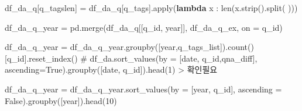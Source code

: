 \documentclass[
  letterpaper,
  DIV=11,
  numbers=noendperiod]{scrartcl}
\newenvironment{Shaded}{\begin{snugshade}}{\end{snugshade}}
\newcommand{\BuiltInTok}[1]{\textcolor[rgb]{0.00,0.23,0.31}{#1}}
\newcommand{\CommentTok}[1]{\textcolor[rgb]{0.37,0.37,0.37}{#1}}
\newcommand{\DecValTok}[1]{\textcolor[rgb]{0.68,0.00,0.00}{#1}}
\newcommand{\KeywordTok}[1]{\textcolor[rgb]{0.00,0.23,0.31}{\textbf{#1}}}
\newcommand{\NormalTok}[1]{\textcolor[rgb]{0.00,0.23,0.31}{#1}}
\newcommand{\OperatorTok}[1]{\textcolor[rgb]{0.37,0.37,0.37}{#1}}
\newcommand{\StringTok}[1]{\textcolor[rgb]{0.13,0.47,0.30}{#1}}
\newcommand{\VariableTok}[1]{\textcolor[rgb]{0.07,0.07,0.07}{#1}}
\begin{document}
\begin{Shaded}
\begin{Highlighting}[]
\NormalTok{df\_da\_q[}\StringTok{\textquotesingle{}q\_tagslen\textquotesingle{}}\NormalTok{] }\OperatorTok{=}\NormalTok{ df\_da\_q[}\StringTok{\textquotesingle{}q\_tags\textquotesingle{}}\NormalTok{].}\BuiltInTok{apply}\NormalTok{(}\KeywordTok{lambda}\NormalTok{ x : }\BuiltInTok{len}\NormalTok{(x.strip().split(}\StringTok{\textquotesingle{} \textquotesingle{}}\NormalTok{)))}
\end{Highlighting}
\end{Shaded}

\begin{Shaded}
\begin{Highlighting}[]
\NormalTok{df\_da\_q\_year }\OperatorTok{=}\NormalTok{ pd.merge(df\_da\_q[[}\StringTok{\textquotesingle{}q\_id\textquotesingle{}}\NormalTok{, }\StringTok{\textquotesingle{}year\textquotesingle{}}\NormalTok{]], df\_da\_q\_ex, on }\OperatorTok{=} \StringTok{\textquotesingle{}q\_id\textquotesingle{}}\NormalTok{)}
\end{Highlighting}
\end{Shaded}

\begin{Shaded}
\begin{Highlighting}[]
\NormalTok{df\_da\_q\_year }\OperatorTok{=}\NormalTok{ df\_da\_q\_year.groupby([}\StringTok{\textquotesingle{}year\textquotesingle{}}\NormalTok{,}\StringTok{\textquotesingle{}q\_tags\_list\textquotesingle{}}\NormalTok{]).count()[}\StringTok{\textquotesingle{}q\_id\textquotesingle{}}\NormalTok{].reset\_index()}
\CommentTok{\#  df\_da.sort\_values(by = [\textquotesingle{}date\textquotesingle{}, \textquotesingle{}q\_id\textquotesingle{},\textquotesingle{}qna\_diff\textquotesingle{}], ascending=True).groupby([\textquotesingle{}date\textquotesingle{}, \textquotesingle{}q\_id\textquotesingle{}]).head(1) \textgreater{} 확인필요 }
\end{Highlighting}
\end{Shaded}

\begin{Shaded}
\begin{Highlighting}[]
\NormalTok{df\_da\_q\_year }\OperatorTok{=}\NormalTok{ df\_da\_q\_year.sort\_values(by }\OperatorTok{=}\NormalTok{ [}\StringTok{\textquotesingle{}year\textquotesingle{}}\NormalTok{, }\StringTok{\textquotesingle{}q\_id\textquotesingle{}}\NormalTok{], ascending }\OperatorTok{=} \VariableTok{False}\NormalTok{).groupby([}\StringTok{\textquotesingle{}year\textquotesingle{}}\NormalTok{]).head(}\DecValTok{10}\NormalTok{)}
\end{Highlighting}
\end{Shaded}
\end{document}
